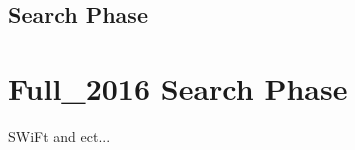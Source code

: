 \subsection{Search Phase}
\label{sec:bkg-summer_results}



\section{Full\_2016 Search Phase}
\label{sec:bkg-full}

SWiFt and ect...
